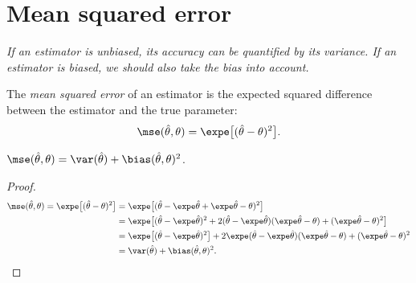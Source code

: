 
\section{Mean squared error}
\bit
\it If an estimator is \emph{unbiased}, its accuracy can be quantified by its variance.
\it If an estimator is \emph{biased}, we should also take the bias into account.
\eit

\begin{definition}
The \emph{mean squared error} of an estimator is the expected squared difference between the estimator and the true parameter:
\[
\mse(\hat{\theta},\theta) = \expe\big[(\hat{\theta}-\theta)^2\big].
\]
\end{definition}

\begin{theorem}
$\mse(\hat{\theta},\theta) = \var(\hat{\theta}) + \bias(\hat{\theta},\theta)^2$.
\end{theorem}
\begin{proof}
\vspace*{-2ex}
\begin{align*}
\mse(\hat{\theta},\theta) = \expe\big[(\hat{\theta}-\theta)^2\big]
	& = \expe\big[(\hat{\theta}-\expe\hat{\theta}    +  \expe\hat{\theta}-\theta)^2\big] \\
	& = \expe\big[(\hat{\theta}-\expe\hat{\theta})^2 + 2(\hat{\theta}-\expe\hat{\theta})(\expe\hat{\theta}-\theta)+ (\expe\hat{\theta}-\theta)^2 \big] \\
	& = \expe\big[(\hat{\theta}-\expe\hat{\theta})^2\big] + 2\expe(\hat{\theta}-\expe\hat{\theta})(\expe\hat{\theta}-\theta)+ (\expe\hat{\theta} - \theta)^2  \\
	& = \var(\hat{\theta}) + \bias(\hat{\theta},\theta)^2.				
\end{align*}
\vspace*{-3ex}
\end{proof}

%


